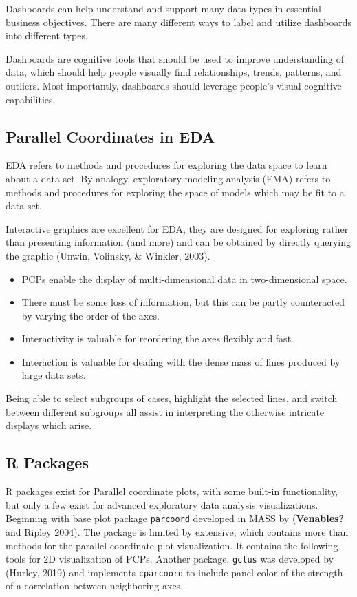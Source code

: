 \documentclass[print]{nuthesis}
\providecommand{\tightlist}{%
  \setlength{\itemsep}{0pt}\setlength{\parskip}{0pt}}
\begin{document}
Dashboards can help understand and support many data types in essential business objectives. There are many different ways to label and utilize dashboards into different types.

Dashboards are cognitive tools that should be used to improve understanding of data, which should help people visually find relationships, trends, patterns, and outliers. Most importantly, dashboards should leverage people's visual cognitive capabilities.

\hypertarget{parallel-coordinates-in-eda}{%
\subsection{Parallel Coordinates in EDA}\label{parallel-coordinates-in-eda}}

EDA refers to methods and procedures for exploring the data space to learn about a data set. By analogy, exploratory modeling analysis (EMA) refers to methods and procedures for exploring the space of models which may be fit to a data set.

Interactive graphics are excellent for EDA, they are designed for exploring rather than presenting information (and more) and can be obtained by directly querying the graphic (Unwin, Volinsky, \& Winkler, 2003).

\begin{itemize}
\tightlist
\item
  PCPs enable the display of multi-dimensional data in two-dimensional space.
\item
  There must be some loss of information, but this can be partly counteracted by varying the order of the axes.
\item
  Interactivity is valuable for reordering the axes flexibly and fast.
\item
  Interaction is valuable for dealing with the dense mass of lines produced by large data sets.
\end{itemize}

Being able to select subgroups of cases, highlight the selected lines, and switch between different subgroups all assist in interpreting the otherwise intricate displays which arise.

\hypertarget{r-packages}{%
\subsection{R Packages}\label{r-packages}}

R packages exist for Parallel coordinate plots, with some built-in functionality, but only a few exist for advanced exploratory data analysis visualizations. Beginning with base plot package \texttt{parcoord} developed in MASS by (\textbf{Venables?} and Ripley 2004). The package is limited by extensive, which contains more than methods for the parallel coordinate plot visualization. It contains the following tools for 2D visualization of PCPs. Another package, \texttt{gclus} was developed by (Hurley, 2019) and implements \texttt{cparcoord} to include panel color of the strength of a correlation between neighboring axes.
\end{document}
